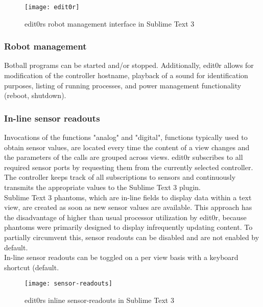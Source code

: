 \documentclass[conference,a4paper]{IEEEtran}
\begin{document}
\begin{figure}[H]
\centering
\texttt{[image: edit0r]}
\caption{edit0rs\cite{edit0r:Philip Trauner} robot management interface in Sublime Text 3\cite{Sublime Text 3:Sublime HQ}}
\label{fig:robot_management}
\end{figure}

\subsubsection{Robot management}
Botball programs can be started and/or stopped.
Additionally, edit0r\cite{edit0r:Philip Trauner} allows for modification of the controller hostname, playback of a sound for identification purposes, listing of running processes, and power management functionality (reboot, shutdown).\\

\subsubsection{In-line sensor readouts}
Invocations of the functions "analog" and "digital", functions typically used to obtain sensor values, are located every time the content of a view changes and the parameters of the calls are grouped across views. edit0r\cite{edit0r:Philip Trauner} subscribes to all required sensor ports by requesting them from the currently selected controller. The controller keeps track of all subscriptions to sensors and continuously transmits the appropriate values to the Sublime Text 3\cite{Sublime Text 3:Sublime HQ} plugin. \\Sublime Text 3 phantoms, which are in-line fields to display data within a text view, are created as soon as new sensor values are available. This approach has the disadvantage of higher than usual processor utilization by edit0r, because phantoms were primarily designed to display infrequently updating content. To partially circumvent this, sensor readouts can be disabled and are not enabled by default.\\
In-line sensor readouts can be toggled on a per view basis with a keyboard shortcut (default.\\

\begin{figure}[H]
\centering
\texttt{[image: sensor-readouts]}
\caption{edit0rs\cite{edit0r:Philip Trauner} inline sensor-readouts in Sublime Text 3\cite{Sublime Text 3:Sublime HQ}}
\label{fig:inline_sensor_readouts}
\end{figure}
\end{document}
